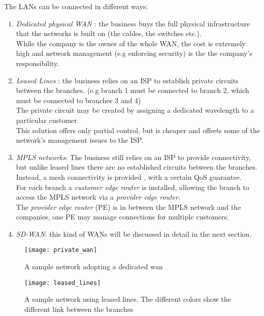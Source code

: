 The LANs can be connected in different ways:
 

\begin{enumerate}
	\item \textit{Dedicated physical WAN} : the business buys the full physical infrastructure that the networks is built on (the cables, the switches etc.). \\ While the company is the owner of the whole WAN, the cost is extremely high and network management (e.g enforcing security) is the the company's responsibility.
	
	\item \textit{Leased Lines} : the business relies on an ISP to establish private circuits between the branches. (e.g branch 1 must be connected to branch 2, which must be connected to branches 3 and 4) \\
	The private circuit may be created by assigning  a dedicated wavelength to a particular customer. \\
	This solution offers only partial control, but is cheaper and offsets some of the network's management issues to the ISP.
	
	\item \textit{MPLS networks}: The business still relies on an ISP to provide connectivity, but unlike leased lines there are no established circuits between the branches.  Instead, a mesh connectivity is provided , with a certain QoS guarantee. \\
	For each branch a \textit{customer edge router} is installed, allowing the branch to access the MPLS network via a \textit{provider edge router}. \\
	The \textit{provider edge router} (PE) is in between the MPLS network and the companies, one PE may manage connections for multiple customers.
	
	\item \textit{SD-WAN}: this kind of WANs will be discussed in detail in the next section.
	
	
	
\end{enumerate}


\begin{figure}[h!]
	\texttt{[image: private\_wan]}
	\caption{A sample network adopting a dedicated wan}	
	\centering
\end{figure}

\begin{figure}[h!]
	\texttt{[image: leased\_lines]}
	\caption{A sample network using leased lines. The different colors show the different link between the branches}	
	\centering
\end{figure}

